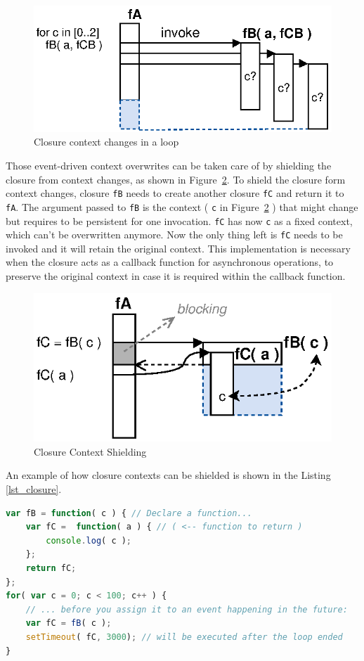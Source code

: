 \begin{figure}[!ht]
	\centering
  \includegraphics{figures/Closures_Closure-2}
	\caption{Closure context changes in a loop}
	\label{fig:Closures_Closure-2}
\end{figure}


Those event-driven context overwrites can be taken care of by shielding the closure from context changes, as shown in Figure~\ref{fig:Closures_Closure-3}.
To shield the closure form context changes, closure \texttt{fB} needs to create another closure \texttt{fC} and return it to \texttt{fA}.
The argument passed to \texttt{fB} is the context ( \texttt{c} in Figure~\ref{fig:Closures_Closure-3} ) that might change but requires to be persistent for one invocation.
\texttt{fC} has now \texttt{c} as a fixed context, which can't be overwritten anymore.
Now the only thing left is \texttt{fC} needs to be invoked and it will retain the original context.
This implementation is necessary when the closure acts as a callback function for asynchronous operations, to preserve the original context in case it is required within the callback function.
\begin{figure}[!ht]
	\centering
  \includegraphics{figures/Closures_Closure-3}
	\caption{Closure Context Shielding}
	\label{fig:Closures_Closure-3}
\end{figure}


An example of how closure contexts can be shielded is shown in the Listing \ref{lst_closure}.
\begin{lstlisting}[float=h,label=lst_closure,language=JavaScript,caption=JavaScript Closure Context Shielding]
var fB = function( c ) { // Declare a function...
	var fC =  function( a ) { // ( <-- function to return )
		console.log( c );
	};
	return fC;
};
for( var c = 0; c < 100; c++ ) {
	// ... before you assign it to an event happening in the future:
	var fC = fB( c );
	setTimeout( fC, 3000); // will be executed after the loop ended
}
\end{lstlisting}


